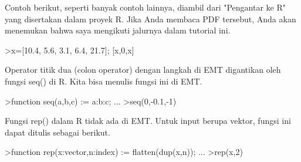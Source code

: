 \documentclass[12pt,arial,letterpaper]{book}
\begin{document}
\begin{eulercomment}
\begin{eulercomment}
\begin{eulercomment}
\begin{eulercomment}
\begin{eulercomment}
\begin{eulercomment}
\begin{eulercomment}
\begin{eulercomment}
\begin{eulercomment}
\begin{eulercomment}
\begin{eulercomment}
\begin{eulercomment}
\begin{eulercomment}
\begin{eulercomment}
\begin{eulercomment}
\begin{eulercomment}
\begin{eulercomment}
\begin{eulercomment}
\begin{eulercomment}
\begin{eulercomment}
\begin{eulercomment}
\begin{eulercomment}
\begin{eulercomment}
\begin{eulercomment}
\begin{eulercomment}
\begin{eulercomment}
\begin{eulercomment}
\begin{eulercomment}
\begin{eulercomment}
\begin{eulercomment}
\begin{eulercomment}
\begin{eulercomment}
\begin{eulercomment}
\begin{eulercomment}
\begin{eulercomment}
\begin{eulercomment}
\begin{eulercomment}
Contoh berikut, seperti banyak contoh lainnya, diambil dari "Pengantar
ke R" yang disertakan dalam proyek R. Jika Anda membaca PDF tersebut,
Anda akan menemukan bahwa saya mengikuti jalurnya dalam tutorial ini.
\end{eulercomment}
\begin{eulerprompt}
>x=[10.4, 5.6, 3.1, 6.4, 21.7]; [x,0,x]
\end{eulerprompt}
\begin{euleroutput}
  [10.4,  5.6,  3.1,  6.4,  21.7,  0,  10.4,  5.6,  3.1,  6.4,  21.7]
\end{euleroutput}
\begin{eulercomment}
Operator titik dua (colon operator) dengan langkah di EMT digantikan
oleh fungsi seq() di R. Kita bisa menulis fungsi ini di EMT.
\end{eulercomment}
\begin{eulerprompt}
>function seq(a,b,c) := a:b:c; ...
>seq(0,-0.1,-1)
\end{eulerprompt}
\begin{euleroutput}
  [0,  -0.1,  -0.2,  -0.3,  -0.4,  -0.5,  -0.6,  -0.7,  -0.8,  -0.9,  -1]
\end{euleroutput}
\begin{eulercomment}
Fungsi rep() dalam R tidak ada di EMT. Untuk input berupa vektor,
fungsi ini dapat ditulis sebagai berikut.
\end{eulercomment}
\begin{eulerprompt}
>function rep(x:vector,n:index) := flatten(dup(x,n)); ...
>rep(x,2)
\end{eulerprompt}
\begin{euleroutput}
  [10.4,  5.6,  3.1,  6.4,  21.7,  10.4,  5.6,  3.1,  6.4,  21.7]
\end{euleroutput}
\begin{eulercomment}

\end{eulercomment}
\end{eulercomment}
\end{eulercomment}
\end{eulercomment}
\end{eulercomment}
\end{eulercomment}
\end{eulercomment}
\end{eulercomment}
\end{eulercomment}
\end{eulercomment}
\end{eulercomment}
\end{eulercomment}
\end{eulercomment}
\end{eulercomment}
\end{eulercomment}
\end{eulercomment}
\end{eulercomment}
\end{eulercomment}
\end{eulercomment}
\end{eulercomment}
\end{eulercomment}
\end{eulercomment}
\end{eulercomment}
\end{eulercomment}
\end{eulercomment}
\end{eulercomment}
\end{eulercomment}
\end{eulercomment}
\end{eulercomment}
\end{eulercomment}
\end{eulercomment}
\end{eulercomment}
\end{eulercomment}
\end{eulercomment}
\end{eulercomment}
\end{eulercomment}
\end{eulercomment}
\end{document}
